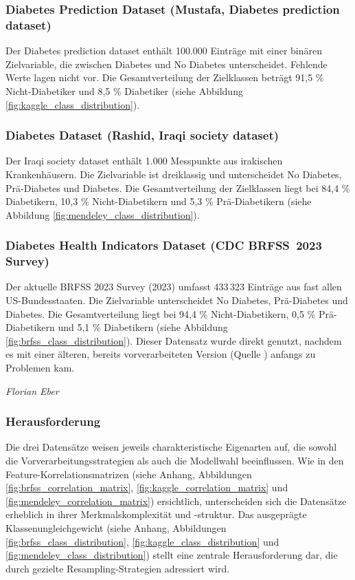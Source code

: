 \documentclass[10pt]{scrartcl}
\begin{document}
\subsubsection{Diabetes Prediction Dataset (Mustafa, Diabetes prediction dataset)}
\label{sec:diabetes_prediction_dataset}
Der Diabetes prediction dataset \cite{mustafa2023} enthält 100.000 Einträge mit einer binären Zielvariable, die zwischen Diabetes und No Diabetes unterscheidet. Fehlende Werte lagen nicht vor. Die Gesamtverteilung der Zielklassen beträgt 91,5 \% Nicht-Diabetiker und 8,5 \% Diabetiker (siehe Abbildung \ref{fig:kaggle_class_distribution}). 

\subsubsection{Diabetes Dataset (Rashid, Iraqi society dataset)}
\label{sec:iraqi_society_dataset}
Der Iraqi society dataset \cite{rashid2020} enthält 1.000 Messpunkte aus irakischen Krankenhäusern. Die Zielvariable ist dreiklassig und unterscheidet No Diabetes, Prä-Diabetes und Diabetes. Die Gesamtverteilung der Zielklassen liegt bei 84,4 \% Diabetikern, 10,3 \% Nicht-Diabetikern und 5,3 \% Prä-Diabetikern (siehe Abbildung \ref{fig:mendeley_class_distribution}).

\subsubsection{Diabetes Health Indicators Dataset (CDC BRFSS 2023 Survey)}
\label{sec:brfss23}
Der aktuelle BRFSS 2023 Survey (2023) \cite{BRFSS2023} umfasst 433\,323 Einträge aus fast allen US-Bundesstaaten. Die Zielvariable unterscheidet No Diabetes, Prä-Diabetes und Diabetes. Die Gesamtverteilung liegt bei 94,4 \% Nicht-Diabetikern, 0,5 \% Prä-Diabetikern und 5,1 \% Diabetikern (siehe Abbildung \ref{fig:brfss_class_distribution}). Dieser Datensatz wurde direkt genutzt, nachdem es mit einer älteren, bereits vorverarbeiteten Version (Quelle \cite{cdc2021}) anfangs zu Problemen kam.

\begin{flushright}
  \footnotesize\textit{Florian Eber}
\end{flushright}

\subsubsection{Herausforderung}
Die drei Datensätze weisen jeweils charakteristische Eigenarten auf, die sowohl die Vorverarbeitungsstrategien als auch die Modellwahl beeinflussen. Wie in den Feature-Korrelationsmatrizen (siehe Anhang, Abbildungen \ref{fig:brfss_correlation_matrix}, \ref{fig:kaggle_correlation_matrix} und \ref{fig:mendeley_correlation_matrix}) ersichtlich, unterscheiden sich die Datensätze erheblich in ihrer Merkmalskomplexität und -struktur. Das ausgeprägte Klassenungleichgewicht (siehe Anhang, Abbildungen \ref{fig:brfss_class_distribution}, \ref{fig:kaggle_class_distribution} und \ref{fig:mendeley_class_distribution}) stellt eine zentrale Herausforderung dar, die durch gezielte Resampling-Strategien adressiert wird.
\end{document}

